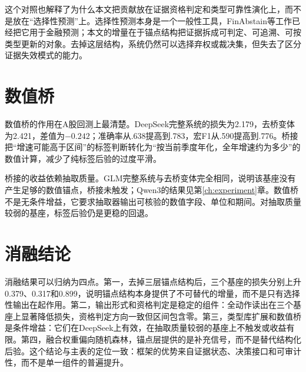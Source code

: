 这个对照也解释了为什么本文把贡献放在证据资格判定和类型可靠性演化上，而不是放在“选择性预测”上。选择性预测本身是一个一般性工具，FinAbstain等工作已经把它用于金融预测；本文的增量在于锚点结构把证据拆成可判定、可追溯、可按类型更新的对象。去掉这层结构，系统仍然可以选择弃权或裁决集，但失去了区分证据失效模式的能力。

\section{数值桥}

数值桥的作用在A股回测上最清楚。DeepSeek完整系统的损失为2.179，去桥变体为2.421，差值为$-0.242$；准确率从.638提高到.783，宏F1从.590提高到.776。桥接把“增速可能高于区间”的标签判断转化为“按当前季度年化，全年增速约为多少”的数值计算，减少了纯标签后验的过度平滑。

桥接的收益依赖抽取质量。GLM完整系统与去桥变体完全相同，说明该基座没有产生足够的数值锚点，桥接未触发；Qwen3的结果见第\ref{ch:experiment}章。数值桥不是无条件增益，它要求抽取器输出可核验的数值字段、单位和期间。对抽取质量较弱的基座，标签后验仍是更稳的回退。

\section{消融结论}

消融结果可以归纳为四点。第一，去掉三层锚点结构后，三个基座的损失分别上升0.379、0.317和0.899，说明锚点结构本身提供了不可替代的增量，而不是只有选择性输出在起作用。第二，输出形式和资格判定是稳定的组件：全动作读出在三个基座上显著降低损失，资格判定方向一致但区间包含零。第三，类型库扩展和数值桥是条件增益：它们在DeepSeek上有效，在抽取质量较弱的基座上不触发或收益有限。第四，融合权重偏向随机森林，锚点层提供的是补充信号，而不是替代结构化后验。这个结论与主表的定位一致：框架的优势来自证据状态、决策接口和可审计性，而不是单一组件的普遍提升。
